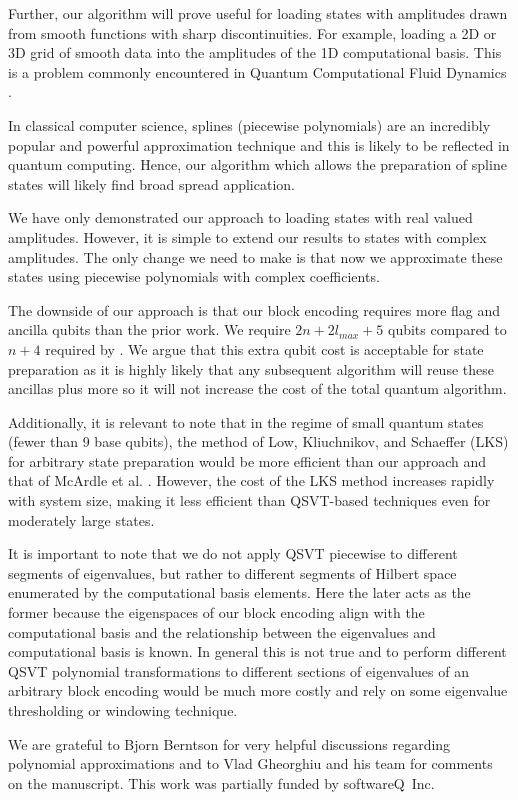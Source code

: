\documentclass[a4paper,twocolumn,,accepted=2025-05-27]{quantumarticle}
\theoremstyle{empty}
\begin{document}
Further, our algorithm will prove useful for loading states with amplitudes drawn from smooth functions with sharp discontinuities. For example, loading a 2D or 3D grid of smooth data into the amplitudes of the 1D computational basis. This is a problem commonly encountered in Quantum Computational Fluid Dynamics \cite{Lapworth:2022rcw}.

In classical computer science, splines (piecewise polynomials) are an incredibly popular and powerful approximation technique and this is likely to be reflected in quantum computing. Hence, our algorithm which allows the preparation of spline states will likely find broad spread application.

We have only demonstrated our approach to loading states with real valued amplitudes. However, it is simple to extend our results to states with complex amplitudes. The only change we need to make is that now we approximate these states using piecewise polynomials with complex coefficients. 

The downside of our approach is that our block encoding requires more flag and ancilla qubits than the prior work. We require $2n +2l_{max} +5$ qubits compared to $n+4$ required by \cite{mcardleQuantumStatePreparation2022}. We argue that this extra qubit cost is acceptable for state preparation as it is highly likely that any subsequent algorithm will reuse these ancillas plus more so it will not increase the cost of the total quantum algorithm.

Additionally, it is relevant to note that in the regime of small quantum states (fewer than 9 base qubits), the method of Low, Kliuchnikov, and Schaeffer (LKS) for arbitrary state preparation \cite{lowTradingTgatesDirty2018} would be more efficient than our approach and that of McArdle et al. \cite{mcardleQuantumStatePreparation2022}. However, the cost of the LKS method increases rapidly with system size, making it less efficient than QSVT-based techniques even for moderately large states.

It is important to note that we do not apply QSVT piecewise to different segments of eigenvalues, but rather to different segments of Hilbert space enumerated by the computational basis elements. Here the later acts as the former because the eigenspaces of our block encoding align with the computational basis and the relationship between the eigenvalues and computational basis is known. In general this is not true and to perform different QSVT polynomial transformations to different sections of eigenvalues of an arbitrary block encoding would be much more costly and rely on some eigenvalue thresholding or windowing technique.
\begin{acknowledgments}
We are grateful to Bjorn Berntson for very helpful discussions regarding polynomial approximations and to Vlad Gheorghiu and his team for comments on the manuscript. This work was partially funded by softwareQ~Inc.
\end{acknowledgments}
\twocolumngrid


\appendix
\end{document}
